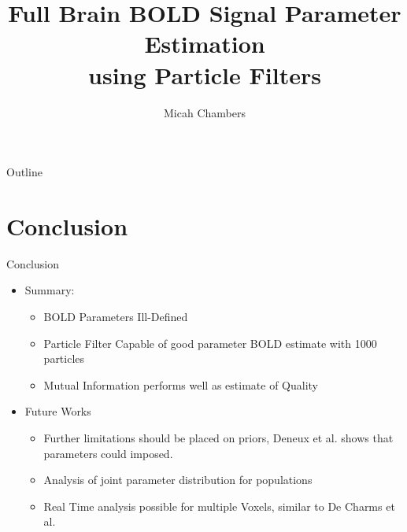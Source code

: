 \documentclass{beamer}
\title{Full Brain BOLD Signal Parameter Estimation \\
using Particle Filters}
\author{Micah Chambers}
\institute{Virginia Tech Bioimaging Systems Lab}
\begin{document}
\begin{frame}
  \titlepage
\end{frame}

\begin{frame}{Outline}
  \tableofcontents
\end{frame}






\section{Conclusion}
\begin{frame}{Conclusion}
\begin{itemize}
    \item Summary:
    \begin{itemize}
    \item BOLD Parameters Ill-Defined
    \item Particle Filter Capable of good parameter BOLD estimate with 1000 particles
    \item Mutual Information performs well as estimate of Quality
    \end{itemize}
    \item Future Works
    \begin{itemize}
        \item Further limitations should be placed on priors, Deneux 
            et al. \cite{Deneux2006} shows that parameters could imposed.
        \item Analysis of joint parameter distribution for populations
        \item Real Time analysis possible for multiple Voxels, similar to
            De Charms et al. \cite{DeCharms2005}

    \end{itemize}
\end{itemize}
\end{frame}
\end{document}
